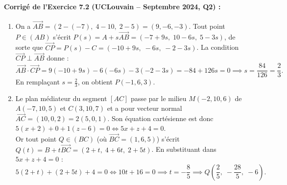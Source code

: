 \paragraph{Corrigé de l'Exercice 7.2 (UCLouvain -- Septembre 2024, Q2) :}
\begin{enumerate}[label=(\alph*)]
    \item On a $\overrightarrow{AB} = (2 - (-7),\; 4 - 10,\; 2 - 5) = (9, -6, -3)$. Tout point $P \in (AB)$ s'écrit $P(s) = A + s\overrightarrow{AB} = (-7+9s,\; 10-6s,\; 5-3s)$, de sorte que $\overrightarrow{CP} = P(s) - C = (-10+9s,\; -6s,\; -2-3s)$. La condition $\overrightarrow{CP} \perp \overrightarrow{AB}$ donne :
    \[
        \overrightarrow{AB} \cdot \overrightarrow{CP} = 9(-10+9s) - 6(-6s) - 3(-2-3s) = -84 + 126s = 0 \implies s = \frac{84}{126} = \frac{2}{3}.
    \]
    En remplaçant $s = \frac{2}{3}$, on obtient $\boxed{P(-1, 6, 3)}$.
    \item Le plan médiateur du segment $[AC]$ passe par le milieu $M\left(-2, 10, 6\right)$ de $A(-7,10,5)$ et $C(3,10,7)$ et a pour vecteur normal $\overrightarrow{AC} = (10, 0, 2) = 2(5, 0, 1)$. Son équation cartésienne est donc $5(x+2) + 0 + 1(z-6) = 0 \iff 5x + z + 4 = 0$.\\
    Or tout point $Q \in (BC)$ (où $\overrightarrow{BC} = (1, 6, 5)$) s'écrit $Q(t) = B + t\overrightarrow{BC} = (2+t,\; 4+6t,\; 2+5t)$. En substituant dans $5x + z + 4 = 0$ :
    \[
        5(2+t) + (2+5t) + 4 = 0 \iff 10t + 16 = 0 \implies t = -\frac{8}{5} \implies \boxed{Q\left(\frac{2}{5},\; -\frac{28}{5},\; -6\right)}.
    \]
\end{enumerate}

